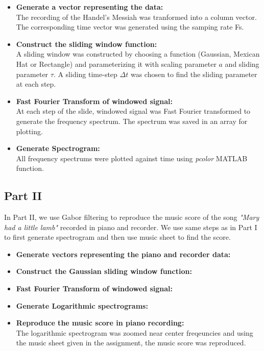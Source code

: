 \documentclass{article}
\begin{document}
\begin{itemize}
\item \textbf{Generate a vector representing the data:} \\
The recording of the Handel's Messiah was tranformed into a column vector. The corresponding time vector was generated using the samping rate Fs.

\item \textbf{Construct the sliding window function:} \\
A sliding window was constructed by choosing a function (Gaussian, Mexican Hat or Rectangle) and parameterizing it with scaling parameter $a$ and sliding parameter $\tau$. A sliding time-step $\Delta t$ was chosen to find the sliding parameter at each step.

\item \textbf{Fast Fourier Transform of windowed signal:} \\
At each step of the slide, windowed signal was Fast Fourier transformed to generate the frequency spectrum. The spectrum was saved in an array for plotting.

\item \textbf{Generate Spectrogram:} \\
All frequency spectrums were plotted against time using \emph{pcolor} MATLAB function.
\end{itemize}
\subsection{Part II}
In Part II, we use Gabor filtering to reproduce the music score of the song \textit{"Mary had a little lamb"} recorded in piano and recorder. We use same steps as  in Part I to first generate spectrogram and then use music sheet to find the score.
\begin{itemize}
\item \textbf{Generate vectors representing the piano and recorder data:} 
\item \textbf{Construct the Gaussian sliding window function:} 
\item \textbf{Fast Fourier Transform of windowed signal:} 
\item \textbf{Generate Logarithmic spectrograms:} 
\item \textbf{Reproduce the music score in piano recording:} \\
The logarithmic spectrogram was zoomed near center freqeuncies and using the music sheet given in the assignment, the music score was reproduced.
\end{itemize}
\end{document}
